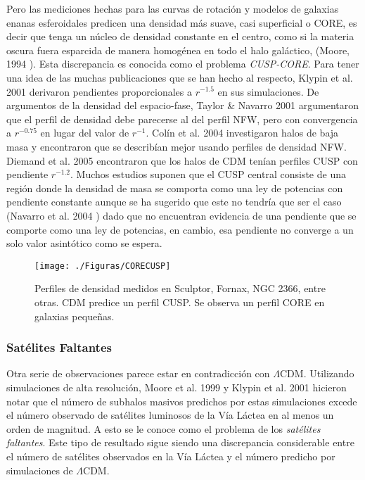 \documentclass[a4paper,openright,12pt]{book}
\begin{document}
Pero las mediciones hechas para las curvas de rotación y modelos de galaxias enanas esferoidales predicen una densidad más suave, casi superficial o CORE, es decir que tenga un núcleo de densidad constante en el centro, como si la materia oscura fuera esparcida de manera homogénea en todo el halo galáctico, (Moore, 1994 \cite{b2}). Esta discrepancia es conocida como el problema \textit{CUSP-CORE}.  Para tener una idea de las muchas publicaciones que se han hecho al respecto, Klypin et al. 2001 \cite{1.2.4} derivaron pendientes proporcionales a $r^{-1.5}$ en sus simulaciones. De argumentos de la densidad del espacio-fase, Taylor \& Navarro 2001 \cite{b26} argumentaron que el perfil de densidad debe parecerse al del perfil NFW, pero con convergencia a $r^{-0.75}$ en lugar del valor de $r^{-1}$. Colín et al. 2004 \cite{b27} investigaron halos de baja masa y encontraron que se describían mejor usando perfiles de densidad NFW. Diemand et al. 2005 \cite{b28} encontraron que los halos de CDM tenían perfiles CUSP con pendiente $r^{-1.2}$. 
Muchos estudios suponen que el CUSP central consiste de una región donde la densidad de masa se comporta como una ley de potencias con pendiente constante aunque se ha sugerido que este no tendría que ser el caso (Navarro et al. 2004 \cite{Navarro Hayashi}) dado que no encuentran evidencia de una pendiente que se comporte como una ley de potencias, en cambio, esa pendiente no converge a un solo valor asintótico como se espera.
\begin{figure}
\centering
  \texttt{[image: ./Figuras/CORECUSP]}
  \caption{\footnotesize{Perfiles de densidad medidos en Sculptor, Fornax, NGC 2366, entre otras. CDM predice un perfil CUSP. Se observa un perfil CORE en galaxias pequeñas.}}
  \label{fig 1.8}
\end{figure}


\subsubsection*{Satélites Faltantes}
Otra serie de observaciones parece estar en contradicción con $\Lambda$CDM. Utilizando simulaciones de alta resolución, Moore et al. 1999 \cite{Moore 1999} y Klypin et al. 2001 \cite{1.2.4} hicieron notar que el número de subhalos masivos predichos por estas simulaciones excede el número observado de satélites luminosos de la Vía Láctea en al menos un orden de magnitud. A esto se le conoce como el problema de los \textit{satélites faltantes}. Este tipo de resultado sigue siendo una discrepancia considerable entre el número de satélites observados en la Vía Láctea y el número predicho por simulaciones de $\Lambda$CDM.
\end{document}
